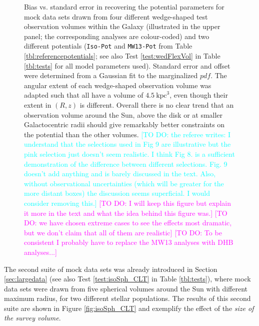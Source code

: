 \documentclass[iop,revtex4]{emulateapj}
\newcommand{\pdf}{\ensuremath{pdf}}
\newcommand{\HW}[1]{\textcolor{Cyan}{#1}}
\newcommand{\Wilma}[1]{\textcolor{Magenta}{#1}}
\begin{document}
\begin{figure}[!htbp]
\caption{Bias vs. standard error in recovering the potential parameters for mock data sets drawn from four different wedge-shaped test observation volumes within the Galaxy (illustrated in the upper panel; the corresponding analyses are colour-coded) and two different potentials (\texttt{Iso-Pot} and \texttt{MW13-Pot} from Table \ref{tbl:referencepotentials}; see also Test \ref{test:wedFlexVol} in Table \ref{tbl:tests} for all model parameters used). Standard error and offset were determined from a Gaussian fit to the marginalized \pdf{}. The angular extent of each wedge-shaped observation volume was adapted such that all have a volume of $4.5~\text{kpc}^3$, even though their extent in $(R,z)$ is different. Overall there is no clear trend that an observation volume around the Sun, above the disk or at smaller Galactocentric radii should give remarkably better constraints on the potential than the other volumes. \HW{[TO DO: the referee writes: I understand that the selections used in Fig 9 are illustrative but the pink selection just doesn't seem realistic. I think Fig 8. is a sufficient demonstration of the difference between different selections. Fig. 9 doesn't add anything and is barely discussed in the text. Also, without observational uncertainties (which will be greater for the more distant boxes) the discussion seems superficial. I would consider removing this.]} \Wilma{[TO DO: I will keep this figure but explain it more in the text and what the idea behind this figure was.]} \Wilma{[TO DO: we have chosen extreme cases to see the effects most dramatic, but we don't claim that all of them are realistic]} \Wilma{[TO DO: To be consistent I probably have to replace the MW13 analyses with DHB analyses...]}}
\label{fig:wedFlexVol_bias_vs_SE}
\end{figure}

The second suite of mock data sets was already introduced in Section \ref{sec:largedata} (see also Test \ref{test:isoSph_CLT} in Table \ref{tbl:tests}), where mock data sets were drawn from five spherical volumes around the Sun with different maximum radius, for two different stellar populations. The results of this second suite are shown in Figure \ref{fig:isoSph_CLT} and exemplify the effect of the {\it size of the survey volume}.
\end{document}
